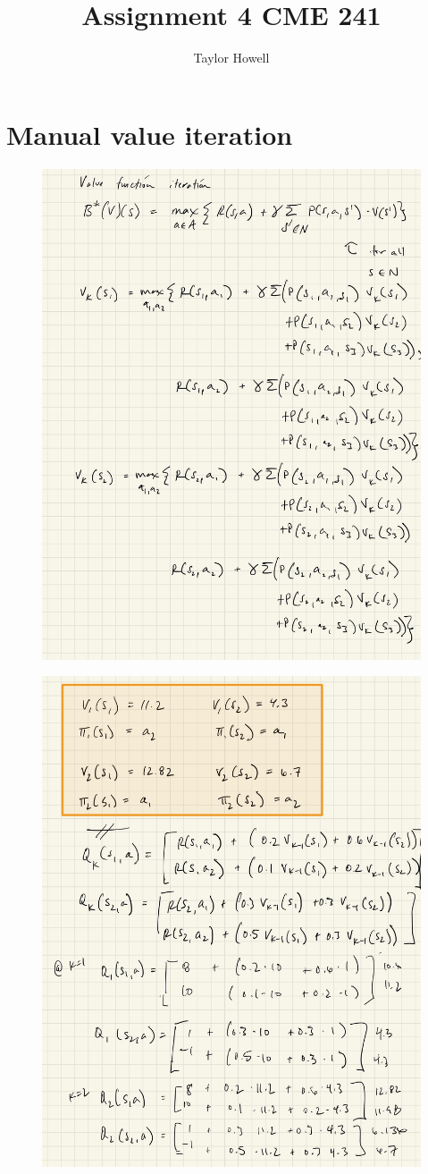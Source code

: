 \documentclass[12pt]{article}
\title{Assignment 4 CME 241}
\author{Taylor Howell}
\begin{document}
\maketitle

\newpage
\section{Manual value iteration}
\begin{figure}[!htb]
	\centering
	\includegraphics[width=.75\textwidth]{ipad/q1_1.jpg}
\end{figure}

\begin{figure}[!htb]
	\centering
	\includegraphics[width=.75\textwidth]{ipad/q1_2.jpg}
\end{figure}
\end{document}
